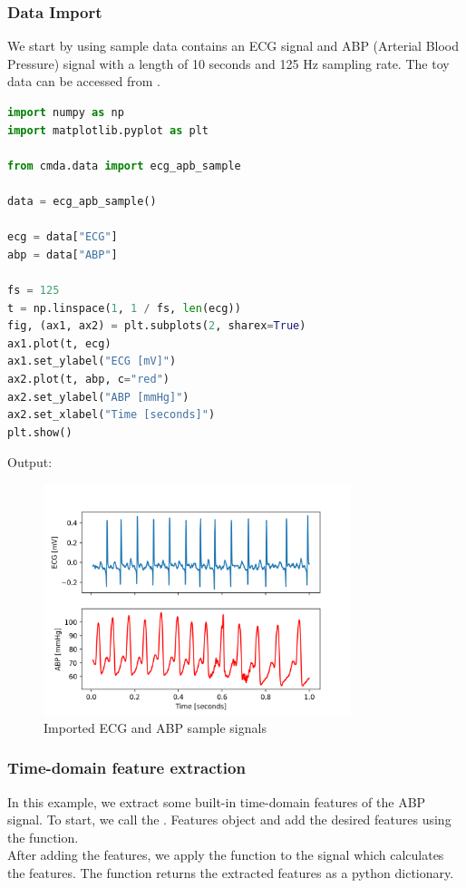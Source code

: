 \documentclass{article}
\begin{document}
\subsubsection{Data Import}
We start by using sample data contains an ECG signal and ABP (Arterial Blood Pressure) signal with a length of 10 seconds and 125 Hz sampling rate. The toy data can be accessed from .

\begin{lstlisting}[language=Python, caption=Importing a sample data]
import numpy as np
import matplotlib.pyplot as plt

from cmda.data import ecg_apb_sample

data = ecg_apb_sample()

ecg = data["ECG"]
abp = data["ABP"]

fs = 125
t = np.linspace(1, 1 / fs, len(ecg))
fig, (ax1, ax2) = plt.subplots(2, sharex=True)
ax1.plot(t, ecg)
ax1.set_ylabel("ECG [mV]")
ax2.plot(t, abp, c="red")
ax2.set_ylabel("ABP [mmHg]")
ax2.set_xlabel("Time [seconds]")
plt.show()
\end{lstlisting}

Output:
\begin{figure}[h]
\includegraphics[width=0.8\textwidth]{ecg_abp_sample.png}
\centering
\caption{Imported ECG and ABP sample signals}
\label{fig:pipeline}
\end{figure}

\subsubsection{Time-domain feature extraction}
In this example, we extract some built-in time-domain features of the ABP signal. To start, we call the . Features object and add the desired features using the  function.\\
After adding the features, we apply the  function to the signal which calculates the features. The  function returns the extracted features as a python dictionary.
\end{document}
